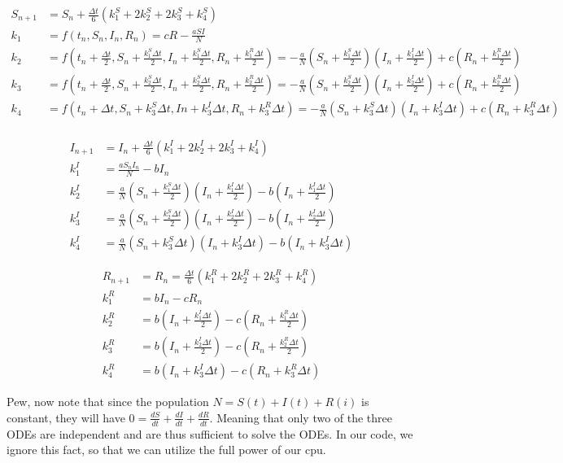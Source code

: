 \begin{align*}
S_{n+1} &= S_n + \frac{\Delta t}{6}(k_1^S + 2k_2^S + 2k_3^S + k_4^S)\\
k_1 &= f(t_n, S_n, I_n, R_n) = cR - \frac{aSI}{N}\\
k_2 &= f(t_n + \frac{\Delta t}{2}, S_n + \frac{k_1^S \Delta t}{2}, I_n + \frac{k_1^S\Delta t}{2}, R_n + \frac{k_1^R\Delta t}{2}) =  - \frac{a}{N}(S_n + \frac{k_1^S \Delta t}{2})( I_n+ \frac{k_1^I\Delta t}{2}) + c(R_n + \frac{k_1^R\Delta t}{2}) \\
k_3 &= f(t_n + \frac{\Delta t}{2}, S_n + \frac{k_2^S \Delta t}{2}, I_n + \frac{k_2^S\Delta t}{2}, R_n + \frac{k_2^R\Delta t}{2}) = - \frac{a}{N}(S_n + \frac{k_2^S \Delta t}{2})( I_n+ \frac{k_2^I\Delta t}{2}) + c(R_n + \frac{k_2^R\Delta t}{2})\\
k_4 &= f(t_n +\Delta t, S_n +k_3^S \Delta t, In + k_3^I \Delta t, R_n + k_3^R\Delta t) = - \frac{a}{N}(S_n + k_3^S\Delta t)(I_n+k_3^I\Delta t)+c(R_n + k_3^R\Delta t)\\
\end{align*}

\begin{align*}
I_{n+1} &= I_n + \frac{\Delta t}{6}(k_1^I + 2k_2^I + 2k_3^I + k_4^I) \\
k_1^I &= \frac{aS_nI_n}{N} - bI_n \\
k_2^I &= \frac{a}{N} (S_n + \frac{k_1^S \Delta t}{2})(I_n + \frac{k_1^I \Delta t}{2}) - b (I_n + \frac{k_1^I \Delta t}{2})\\
k_3^I &= \frac{a}{N}(S_n + \frac{k_2^S \Delta t}{2})(I_n + \frac{k_2^I \Delta t}{2}) - b(I_n + \frac{k_2^I \Delta t}{2}) \\
k_4^I &= \frac{a}{N}(S_n + k_3^S \Delta t)(I_n + k_3^I \Delta t) - b(I_n + k_3^I \Delta t) 
\end{align*}

\begin{align*}
R_{n+1} &= R_n = \frac{\Delta t}{6}(k_1^R + 2k_2^R +2k_3^R + k_4^R)\\
k_1^R &= bI_n - cR_n \\
k_2^R &= b(I_n + \frac{k_1^I \Delta t}{2}) - c(R_n + \frac{k_1^R \Delta t}{2})\\
k_3^R &= b(I_n + \frac{k_2^I \Delta t}{2}) - c(R_n + \frac{k_2^R \Delta t}{2})\\
k_4^R &= b(I_n + k_3^I \Delta t) - c(R_n + k_3^R \Delta t)
\end{align*}

Pew, now note that since the population $ N = S(t) + I(t) + R(i) $ is constant, they will have $0 = \frac{dS}{dt} + \frac{dI}{dt} + \frac{dR}{dt}$. Meaning that only two of the three ODEs are independent and are thus sufficient to solve the ODEs. In our code, we ignore this fact, so that we can utilize the full power of our cpu. 

